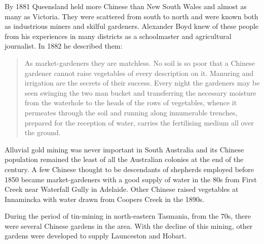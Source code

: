 By 1881 Queensland held more Chinese than New South Wales and almost
as many as Victoria.  They were scattered from south to north and were
known both as industrious miners and skilful gardeners.  Alexander
Boyd knew of these people from his experiences in many districts as a
schoolmaster and agricultural journalist.  In 1882 he described them:
\begin{quote}
	As market-gardeners they are matchless.  No soil is so poor
	that a Chinese gardener cannot raise vegetables of every
	description on it.  Manuring and irrigation are the secrets of
	their success.  Every night the gardeners may be seen swinging
	the two man bucket and transferring the necessary moisture
	from the waterhole to the heads of the rows of vegetables,
	whence it permeates through the soil and running along
	innumerable trenches, prepared for the reception of water,
	carries the fertilising medium all over the
	ground.
\end{quote}

Alluvial gold mining was never important in South Australia and its
Chinese population remained the least of all the Australian colonies
at the end of the century.  A few Chinese thought to be descendants of
shepherds employed before 1850 became market-gardeners with a good
supply of water in the 80s from First Creek near Waterfall Gully in
Adelaide.  Other Chinese raised vegetables at
Innamincka with water drawn from Coopers Creek in the 1890s.

During the period of tin-mining in north-eastern Tasmania, from the
70s, there were several Chinese gardens in the area.  With the decline
of this mining, other gardens were developed to supply Launceston and
Hobart.

